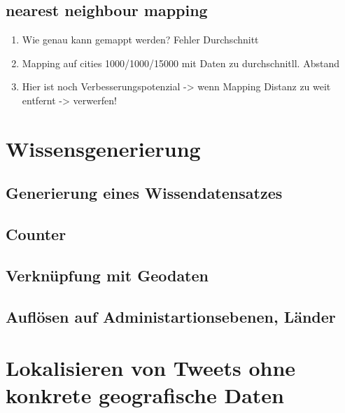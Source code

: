	\subsection{nearest neighbour mapping}
		\begin{enumerate}
			\item {} Wie genau kann gemappt werden? Fehler Durchschnitt
			\item Mapping auf cities 1000/1000/15000 mit Daten zu durchschnitll. Abstand
			\item Hier ist noch Verbesserungspotenzial -> wenn Mapping Distanz zu weit entfernt -> verwerfen! 
		\end{enumerate} 



\section{Wissensgenerierung}
	
	\subsection{Generierung eines Wissendatensatzes}

	\subsection{Counter}

	\subsection{Verknüpfung mit Geodaten}

	\subsection{Auflösen auf Administartionsebenen, Länder}

\section{Lokalisieren von Tweets ohne konkrete geografische Daten}





